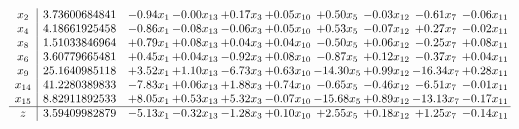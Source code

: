 \documentclass[9pt]{article}
\begin{document}
\[\begin{array}{c| c c@{\hskip 2pt} c@{\hskip 2pt} c@{\hskip 2pt} c@{\hskip 2pt} c@{\hskip 2pt} c@{\hskip 2pt} c@{\hskip 2pt} c@{\hskip 2pt} }
 x_{2}   &  3.73600684841 & -0.94 x_{1} & -0.00 x_{13} & +  0.17 x_{3} & +  0.05 x_{10} & +  0.50 x_{5} & -0.03 x_{12} & -0.61 x_{7} & -0.06 x_{11}\\
 x_{4}   &  4.18661925458 & -0.86 x_{1} & -0.08 x_{13} & -0.06 x_{3} & +  0.05 x_{10} & +  0.53 x_{5} & -0.07 x_{12} & +  0.27 x_{7} & -0.02 x_{11}\\
 x_{8}   &  1.51033846964 & +  0.79 x_{1} & +  0.08 x_{13} & +  0.04 x_{3} & +  0.04 x_{10} & -0.50 x_{5} & +  0.06 x_{12} & -0.25 x_{7} & +  0.08 x_{11}\\
 x_{6}   &  3.60779665481 & +  0.45 x_{1} & +  0.04 x_{13} & -0.92 x_{3} & +  0.08 x_{10} & -0.87 x_{5} & +  0.12 x_{12} & -0.37 x_{7} & +  0.04 x_{11}\\
 x_{9}   &  25.1640985118 & +  3.52 x_{1} & +  1.10 x_{13} & -6.73 x_{3} & +  0.63 x_{10} & -14.30 x_{5} & +  0.99 x_{12} & -16.34 x_{7} & +  0.28 x_{11}\\
 x_{14}   &  41.2280389833 & -7.83 x_{1} & +  0.06 x_{13} & +  1.88 x_{3} & +  0.74 x_{10} & -0.65 x_{5} & -0.46 x_{12} & -6.51 x_{7} & -0.01 x_{11}\\
 x_{15}   &  8.82911892533 & +  8.05 x_{1} & +  0.53 x_{13} & +  5.32 x_{3} & -0.07 x_{10} & -15.68 x_{5} & +  0.89 x_{12} & -13.13 x_{7} & -0.17 x_{11}\\
\hline
z    &  3.59409982879 & -5.13 x_{1} & -0.32 x_{13} & -1.28 x_{3} & +  0.10 x_{10} & +  2.55 x_{5} & +  0.18 x_{12} & +  1.25 x_{7} & -0.14 x_{11}\\
\end{array}\]
\end{document}

